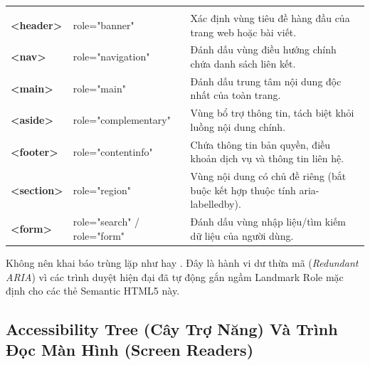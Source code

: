 \begin{prettyTableBox}
\begin{tabularx}{\linewidth}{>{\ttfamily\bfseries\color{primaryBlue}}K{2.5cm} >{\ttfamily\color{codeKeyword}}K{3.5cm} Z}
 &  &  \\

<header> & role="banner" & Xác định vùng tiêu đề hàng đầu của trang web hoặc bài viết. \\

<nav> & role="navigation" & Đánh dấu vùng điều hướng chính chứa danh sách liên kết. \\

<main> & role="main" & Đánh dấu trung tâm nội dung độc nhất của toàn trang. \\

<aside> & role="complementary" & Vùng bổ trợ thông tin, tách biệt khỏi luồng nội dung chính. \\

<footer> & role="contentinfo" & Chứa thông tin bản quyền, điều khoản dịch vụ và thông tin liên hệ. \\

<section> & role="region" & Vùng nội dung có chủ đề riêng (bắt buộc kết hợp thuộc tính aria-labelledby). \\

<form> & role="search" / role="form" & Đánh dấu vùng nhập liệu/tìm kiếm dữ liệu của người dùng. \\
\end{tabularx}
\end{prettyTableBox}

\begin{warnBox}
Không nên khai báo trùng lặp như  hay . Đây là hành vi dư thừa mã (\textit{Redundant ARIA}) vì các trình duyệt hiện đại đã tự động gắn ngầm Landmark Role mặc định cho các thẻ Semantic HTML5 này.
\end{warnBox}

\subsection{Accessibility Tree (Cây Trợ Năng) Và Trình Đọc Màn Hình (Screen Readers)}

